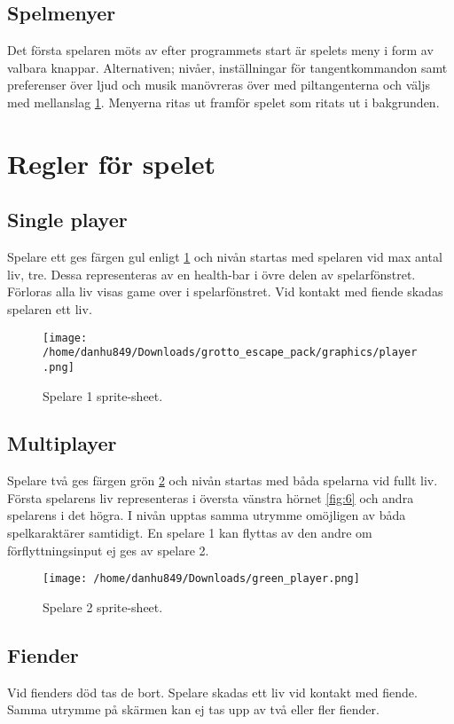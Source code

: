 \documentclass{TDP005mall}
\begin{document}
\subsection{Spelmenyer}
Det första spelaren möts av efter programmets start är spelets meny i form av valbara knappar. Alternativen; nivåer, inställningar för tangentkommandon samt preferenser över ljud och musik manövreras över med piltangenterna och väljs med mellanslag \ref{fig:4}. Menyerna ritas ut framför spelet som ritats ut i bakgrunden.

\newpage

\section{Regler för spelet}%

\subsection{Single player}
 Spelare ett ges färgen gul enligt \ref{fig:4} och nivån startas med spelaren vid max antal liv, tre. Dessa representeras av en health-bar i övre delen av spelarfönstret. Förloras alla liv visas game over i spelarfönstret. Vid kontakt med fiende skadas spelaren ett liv.

\begin{figure}[h!]
  \texttt{[image: /home/danhu849/Downloads/grotto\_escape\_pack/graphics/player.png]}
  \caption{Spelare 1 sprite-sheet.\label{fig:4}}
\end{figure}

\subsection{Multiplayer}
Spelare två ges färgen grön \ref{fig:5} och nivån startas med båda spelarna vid fullt liv. Första spelarens liv representeras i översta vänstra hörnet \ref{fig:6} och andra spelarens i det högra. I nivån upptas samma utrymme omöjligen av båda spelkaraktärer samtidigt. En spelare 1 kan flyttas av den andre om förflyttningsinput ej ges av spelare 2.

\begin{figure}[h!]
  \texttt{[image: /home/danhu849/Downloads/green\_player.png]}
  \caption{Spelare 2 sprite-sheet.\label{fig:5}}
\end{figure}

\subsection{Fiender}
Vid fienders död tas de bort. Spelare skadas ett liv vid kontakt med fiende. Samma utrymme på skärmen kan ej tas upp av två eller fler fiender.
\newpage
\end{document}
